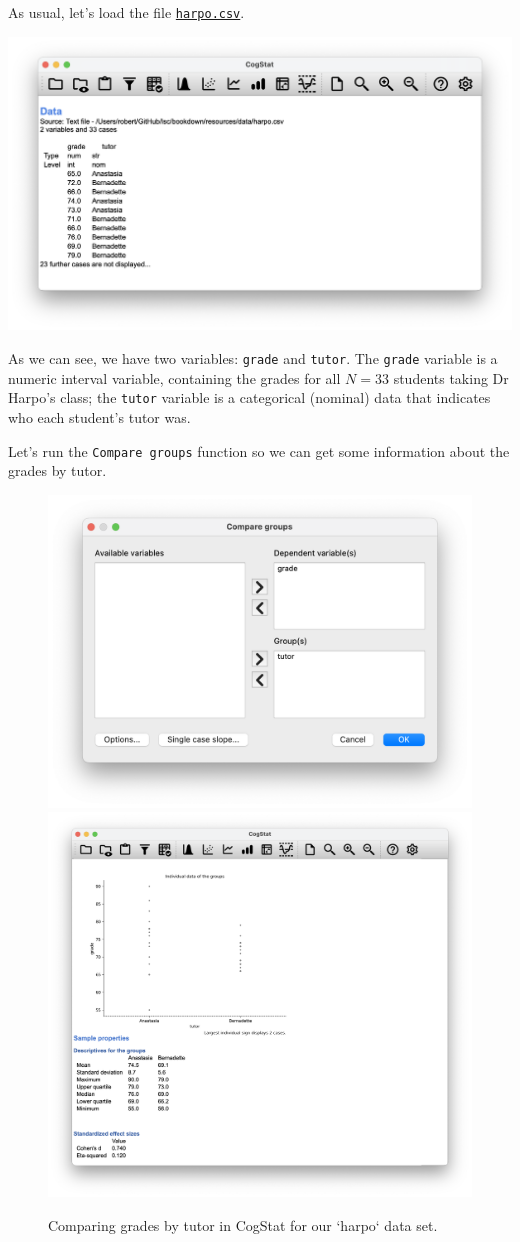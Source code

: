 \documentclass[
]{book}
\theoremstyle{definition}
\theoremstyle{definition}
\theoremstyle{definition}
\theoremstyle{definition}
\theoremstyle{remark}
\begin{document}
As usual, let's load the file \href{resources/data/harpo.csv}{\texttt{harpo.csv}}.

\begin{center}\includegraphics[width=0.66\linewidth]{resources/image/cogstatloadharpo} \end{center}

As we can see, we have two variables: \texttt{grade} and \texttt{tutor}. The \texttt{grade} variable is a numeric interval variable, containing the grades for all \(N = 33\) students taking Dr Harpo's class; the \texttt{tutor} variable is a categorical (nominal) data that indicates who each student's tutor was.

Let's run the \texttt{Compare\ groups} function so we can get some information about the grades by tutor.

\begin{figure}

{\centering \includegraphics[width=0.66\linewidth]{resources/image/cogstatharpocomparedialog} \includegraphics[width=0.66\linewidth]{resources/image/cogstatharposampleproperties} 

}

\caption{Comparing grades by tutor in CogStat for our `harpo` data set.}\label{fig:harpocompare}
\end{figure}
\end{document}
